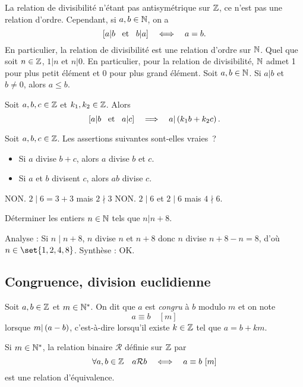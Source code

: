 \documentclass{magnolia}
\begin{document}
\begin{remarques}
\remarque La relation de divisibilité n'étant pas antisymétrique sur $\mathbb{Z}$, ce
  n'est pas une relation d'ordre. Cependant, si $a,b\in\mathbb{N}$, on a
  \[\left[a|b \quad\!\text{et}\quad\! b|a\right]\quad\Longleftrightarrow\quad a=b.\]
  En particulier, la relation de divisibilité est une relation d'ordre sur $\mathbb{N}$.
\remarque Quel que soit $n\in\mathbb{Z}$,  $1 | n$ et $n | 0$. En particulier, pour la relation de divisibilité, $\mathbb{N}$ admet 1 pour plus petit élément et 0 pour plus grand élément.
\remarque Soit $a,b\in\mathbb{N}$. Si $a|b$ et $b\neq 0$, alors $a\leq b$.
\end{remarques}

\begin{proposition}
Soit $a,b,c\in\mathbb{Z}$ et $k_1,k_2\in\mathbb{Z}$. Alors
\[\left[a|b \quad\!\text{et}\quad\! a|c\right]\quad\Longrightarrow\quad a|\left(k_1b+k_2c\right).\]
\end{proposition}

\begin{exos}
\exo Soit $a,b,c\in\mathbb{Z}$. Les assertions suivantes sont-elles vraies~?
  \begin{itemize}
  \item Si $a$ divise $b+c$, alors $a$ divise $b$ et $c$.
  \item Si $a$ et $b$ divisent $c$, alors $ab$ divise $c$.
  \end{itemize}
\begin{sol}
NON. $2\mid6=3+3$ mais $2\nmid 3$
NON. $2\mid 6$ et $2\mid6$ mais $4\nmid6$.
\end{sol}
\exo Déterminer les entiers $n\in\mathbb{N}$ tels que $n|n+8$.
\begin{sol}
Analyse : Si $n\mid n+8$, $n$ divise $n$ et $n+8$ donc $n$ divise $n+8-n=8$, d'où $n\in \set{1,2,4,8}$.
Synthèse : OK.
\end{sol}
\end{exos}

\subsection{Congruence, division euclidienne}

\begin{definition}
Soit $a,b\in\mathbb{Z}$ et $m\in{\mathbb{N}^*}$. On dit que $a$ est \emph{congru} à $b$ modulo $m$ et on
note
\[a\equiv b\quad[m]\]
lorsque $m|\left(a-b\right)$, c'est-à-dire lorsqu'il existe $k\in\mathbb{Z}$ tel que
$a=b+km$.
\end{definition}

\begin{remarqueUnique}
\remarque Si $m\in{\mathbb{N}^*}$, la relation binaire $\mathcal{R}$ définie sur $\mathbb{Z}$ par
  \[\forall a,b\in\mathbb{Z} \quad a\mathcal{R}b \quad\Longleftrightarrow\quad a\equiv b\ [m]\]
  est une relation d'équivalence.
\end{remarqueUnique}
\end{document}
